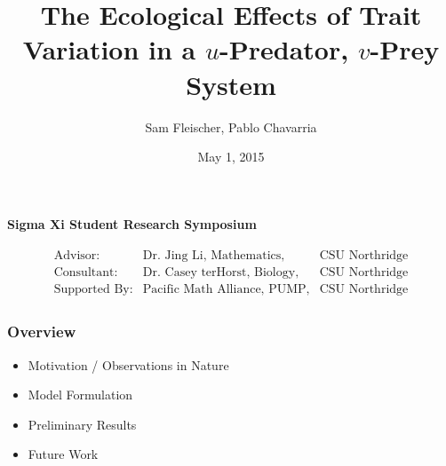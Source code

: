 \documentclass[10pt]{beamer}
\title{The Ecological Effects of Trait Variation in a $u$-Predator, $v$-Prey System}
\author{Sam Fleischer, Pablo Chavarria}
\date{May 1, 2015}
\begin{document}
\begin{frame}
	\titlepage
	\begin{center}
		{\bf Sigma Xi Student Research Symposium}
	\end{center}
	\begin{align*}
		\begin{array}{lll}
		\text{Advisor:} & \text{Dr. Jing Li, Mathematics,} & \text{CSU Northridge} \\
		\text{Consultant:} & \text{Dr. Casey terHorst, Biology,} & \text{CSU Northridge} \\
		\text{Supported By:} & \text{Pacific Math Alliance, PUMP,} & \text{CSU Northridge}
		\end{array}
	\end{align*}
\end{frame}

\begin{frame}
	\frametitle{Overview}
	\begin{itemize}
		\item Motivation / Observations in Nature
		\item Model Formulation
		\item Preliminary Results
		\item Future Work
	\end{itemize}
\end{frame}
\end{document}
